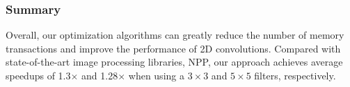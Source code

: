 %
%
%





\subsubsection{Summary} Overall, our optimization algorithms can greatly reduce the number of memory transactions and improve the performance of 2D
convolutions. Compared with state-of-the-art image processing libraries, NPP, our approach achieves average speedups of 1.3$\times$ and
1.28$\times$ when using a $3 \times 3$ and $5 \times 5$ filters, respectively.

